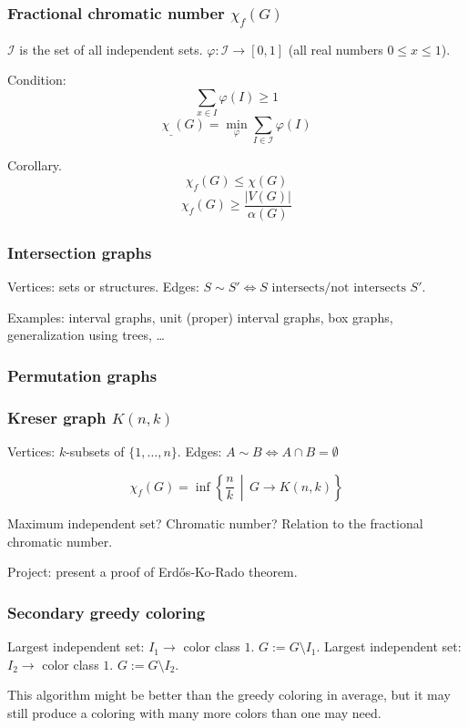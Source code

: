 \documentclass[12pt,a4paper]{article}
\begin{document}
\subsubsection{Fractional chromatic number \(\chi_f(G)\)}
\(\mathcal{I}\) is the set of all independent sets.
\(\varphi: \mathcal{I} \to [0, 1]\) (all real numbers \(0 \leq x \leq 1\)).

Condition: \[\sum_{x \in I} \varphi(I) \geq 1\]
\[\chi_{\_}(G) = \min_\varphi \sum_{I \in \mathcal{I}} \varphi(I)\]

Corollary. \[\chi_f(G) \leq \chi(G)\]
\[\chi_f(G) \geq \frac{|V(G)|}{\alpha(G)}\]

\subsubsection{Intersection graphs}
Vertices: sets or structures.
Edges: \(S \sim S' \Leftrightarrow S \text{ intersects/not intersects } S'\).

Examples: interval graphs, unit (proper) interval graphs, box graphs,
generalization using trees, …

\subsubsection{Permutation graphs}
\subsubsection{Kreser graph \(K(n, k)\)}
Vertices: \(k\)-subsets of \(\{1, \dots, n\}\).
Edges: \(A \sim B \Leftrightarrow A \cap B = \emptyset\)

\[\chi_f(G) = \inf\left\{ \frac{n}{k} \,\middle|\, G \to K(n, k)\right\}\]

Maximum independent set? Chromatic number? Relation to the fractional chromatic
number.

Project: present a proof of Erdős-Ko-Rado theorem.

\subsubsection{Secondary greedy coloring}
Largest independent set: \(I_1 \to\) color class \(1\).  \(G := G \setminus I_1\).
Largest independent set: \(I_2 \to\) color class \(1\).  \(G := G \setminus I_2\).

This algorithm might be better than the greedy coloring in average, but it may
still produce a coloring with many more colors than one may need.
\end{document}
